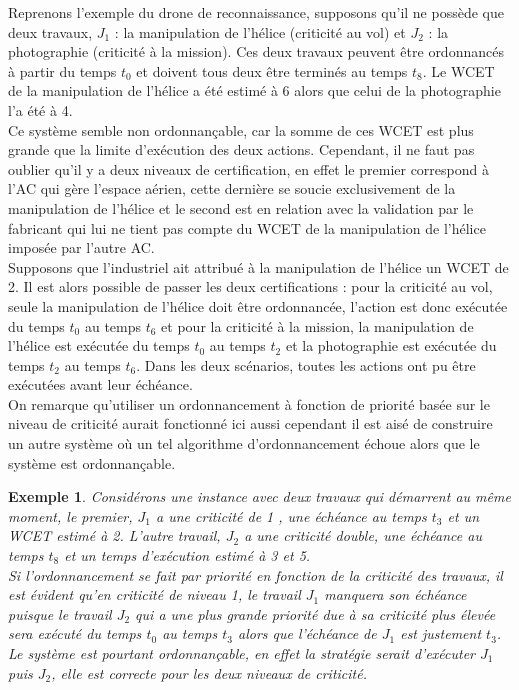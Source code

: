 \documentclass[a4paper]{report}
\theoremstyle{break}
\newtheorem{exem}{Exemple}
\theoremstyle{breakplain}
\begin{document}
Reprenons l'exemple du drone de reconnaissance, supposons qu'il ne possède que deux travaux, $J_1$ : la manipulation de l'hélice (criticité au vol) et  $J_2$ : la photographie (criticité à la mission). Ces deux travaux peuvent être ordonnancés à partir du temps $t_0$ et doivent tous deux être terminés au temps $t_8$. Le WCET de la manipulation de l'hélice a été estimé à 6 alors que celui de la photographie l'a été à 4.\\

Ce système semble non ordonnançable, car la somme de ces WCET est plus grande que la limite d'exécution des deux actions. Cependant, il ne faut pas oublier qu'il y a deux niveaux de certification, en effet le premier correspond à l'AC qui gère l'espace aérien, cette dernière se soucie exclusivement de la manipulation de l'hélice et le second est en relation avec la validation par le fabricant qui lui ne tient pas compte du WCET de la manipulation de l'hélice imposée par l'autre AC.\\
Supposons que l'industriel ait attribué à la manipulation de l'hélice un WCET de 2. Il est alors possible de passer les deux certifications : pour la criticité au vol, seule la manipulation de l'hélice doit être ordonnancée, l'action est donc exécutée du temps $t_0$ au temps $t_6$ et pour la criticité à la mission, la manipulation de l'hélice est exécutée du temps $t_0$ au temps $t_2$ et la photographie est exécutée du temps $t_2$ au temps $t_6$. Dans les deux scénarios, toutes les actions ont pu être exécutées avant leur échéance.\\

On remarque qu'utiliser un ordonnancement à fonction de priorité basée sur le niveau de criticité aurait fonctionné ici aussi cependant il est aisé de construire un autre système où un tel algorithme d'ordonnancement échoue alors que le système est ordonnançable.

\begin{exem}
Considérons une instance avec deux travaux qui démarrent au même moment, le premier, $J_1$ a une criticité de 1 , une échéance au temps $t_3$ et un WCET estimé à 2. L'autre travail, $J_2$ a une criticité double, une échéance au temps $t_8$ et un temps d'exécution estimé à 3 et 5.\\
Si l'ordonnancement se fait par priorité en fonction de la criticité des travaux, il est évident qu'en criticité de niveau 1, le travail $J_1$ manquera son échéance puisque le travail $J_2$ qui a une plus grande priorité due à sa criticité plus élevée sera exécuté du temps $t_0$ au temps $t_3$ alors que l'échéance de $J_1$ est justement $t_3$.\\
Le système est pourtant ordonnançable, en effet la stratégie serait d'exécuter $J_1$ puis $J_2$, elle est correcte pour les deux niveaux de criticité.
\end{exem}
\end{document}
